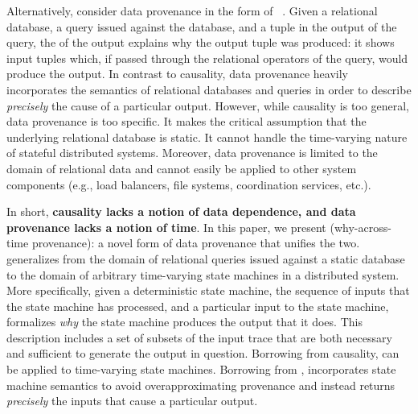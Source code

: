 Alternatively, consider data provenance in the form of
\emph{\whyprovenance{}}~\cite{cheney2009provenance, buneman2001and}. Given a
relational database, a query issued against the database, and a tuple in the
output of the query, the \whyprovenance{} of the output explains     why the
output tuple was produced: it shows input tuples which, if passed through the relational operators of the query, would produce the output. In contrast to causality, data provenance heavily
incorporates the semantics of relational databases and queries in order to
describe \emph{precisely} the cause of a particular output. 
However, while
causality is too general, data provenance is too specific. It makes the
critical assumption that the underlying relational database is static. 
It
cannot handle the time-varying nature of stateful distributed systems.
Moreover, data provenance is limited to the domain of relational data and
cannot easily be applied to other system components (e.g., load balancers, file
systems, coordination services, etc.).

In short, \textbf{causality lacks a notion of data dependence, and data
provenance lacks a notion of time}. In this paper, we present
 (why-across-time provenance): a novel form of data
provenance that unifies the two. \Watprovenance{} generalizes \whyprovenance{}
from the domain of relational queries issued against a static database to the
domain of arbitrary time-varying state machines in a distributed system. More
specifically, given a deterministic state machine, the sequence of inputs that
the state machine has processed, and a particular input to the state machine,
\watprovenance{} formalizes \emph{why} the state machine produces the output
that it does. This description includes a set of subsets of the input trace
that are both necessary and sufficient to generate the output in question.
Borrowing from causality, \watprovenance{} can be applied to time-varying state
machines.  Borrowing from \whyprovenance{}, \watprovenance{} incorporates state
machine semantics to avoid overapproximating provenance and instead returns
\emph{precisely} the inputs that cause a particular output.

